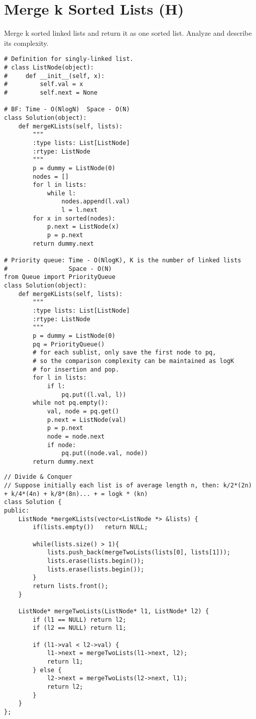 \section{Merge k Sorted Lists (H)}
Merge k sorted linked lists and return it as one sorted list. Analyze and describe its complexity. \\
 
 \begin{lstlisting}
# Definition for singly-linked list.
# class ListNode(object):
#     def __init__(self, x):
#         self.val = x
#         self.next = None

# BF: Time - O(NlogN)  Space - O(N)
class Solution(object):
    def mergeKLists(self, lists):
        """
        :type lists: List[ListNode]
        :rtype: ListNode
        """
        p = dummy = ListNode(0)
        nodes = []
        for l in lists:
            while l:
                nodes.append(l.val)
                l = l.next
        for x in sorted(nodes):
            p.next = ListNode(x)
            p = p.next
        return dummy.next
 
# Priority queue: Time - O(NlogK), K is the number of linked lists
#                 Space - O(N)
from Queue import PriorityQueue
class Solution(object):
    def mergeKLists(self, lists):
        """
        :type lists: List[ListNode]
        :rtype: ListNode
        """
        p = dummy = ListNode(0)
        pq = PriorityQueue()
        # for each sublist, only save the first node to pq,
        # so the comparison complexity can be maintained as logK 
        # for insertion and pop.
        for l in lists:
            if l: 
                pq.put((l.val, l))
        while not pq.empty():
            val, node = pq.get()
            p.next = ListNode(val)
            p = p.next
            node = node.next
            if node: 
                pq.put((node.val, node))
        return dummy.next
\end{lstlisting}
 
\begin{lstlisting}
// Divide & Conquer
// Suppose initially each list is of average length n, then: k/2*(2n) + k/4*(4n) + k/8*(8n)... + = logk * (kn)
class Solution {
public:
    ListNode *mergeKLists(vector<ListNode *> &lists) {
        if(lists.empty())   return NULL;
        
        while(lists.size() > 1){
            lists.push_back(mergeTwoLists(lists[0], lists[1]));
            lists.erase(lists.begin());
            lists.erase(lists.begin());
        }
        return lists.front();
    }
    
    ListNode* mergeTwoLists(ListNode* l1, ListNode* l2) {
        if (l1 == NULL) return l2;
        if (l2 == NULL) return l1;
        
        if (l1->val < l2->val) {
            l1->next = mergeTwoLists(l1->next, l2);
            return l1;
        } else {
            l2->next = mergeTwoLists(l2->next, l1);
            return l2;
        }
    }
};
\end{lstlisting}


